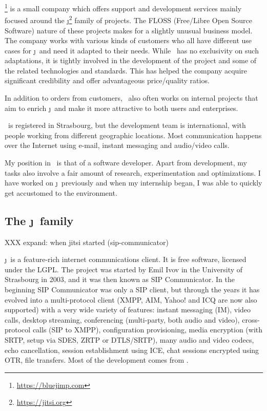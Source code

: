 \documentclass[twoside,openright,a4paper,11pt,english]{article}
\begin{document}
\bj\footnote{\url{https://bluejimp.com}} is a small company which
offers support and development services mainly focused around the
\j\footnote{\url{https://jitsi.org}}
 family of projects. The FLOSS (Free/Libre Open Source Software)
nature of these projects makes for a slightly unusual business model. The
company works with various kinds of customers who all have different use cases
for \j\ and need it adapted to their needs. While \bj\ has no exclusivity
on such adaptations, it is tightly involved in the development of the project
and some of the related technologies and standards. This has helped the company
acquire significant credibility and offer advantageous price/quality ratios.

In addition to orders from customers, \bj\ also often works on internal projects
that aim to enrich \j\ and make it more attractive to both users and
enterprises. 

\bj\ is registered in Strasbourg, but the development team is international,
with people working from different geographic locations. Most communication happens over
the Internet using e-mail, instant messaging and audio/video calls.

My position in \bj\ is that of a software developer. Apart from development, my tasks also 
involve a fair amount of research, experimentation and optimizations. I have
worked on \j\ previously and when my internship began, I was able to quickly
get accustomed to the environment. 




\subsection{The \j\ family}
\label{intro-jitsi}

XXX expand: when jitsi started (sip-communicator)

\j\ is a feature-rich internet communications client.
It is free software, licensed under the LGPL\cite{lgpl}.
The project was started by Emil Ivov in
the University of Strasbourg in 2003, and it was then known as SIP
Communicator. In the beginning
SIP Communicator was only a SIP client, but through the years it has evolved
into a multi-protocol
client (XMPP, AIM, Yahoo! and ICQ are now also supported) with a very wide variety
of features: instant messaging (IM), video calls, desktop streaming,
conferencing (multi-party, both audio and video), cross-protocol calls (SIP to
XMPP), configuration provisioning, media encryption (with SRTP, setup via SDES,
ZRTP or DTLS/SRTP), many audio and video codecs, echo cancellation, session
establishment using ICE, chat sessions encrypted using OTR, file transfers.
Most of the development comes from \bj.
\end{document}
